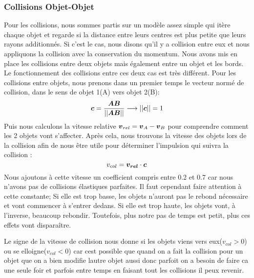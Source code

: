 \documentclass[a4paper, 11pt, oneside]{article} %
\begin{document}
        \subsubsection{Collisions Objet-Objet}
            Pour les collisions, nous sommes partis sur un modèle assez simple qui itère chaque objet et regarde si la distance entre leurs centres est plus petite que leurs rayons additionnés. Si c'est le cas, nous disons qu'il y a collision entre eux et nous appliquons la collision avec la conservation du momentum. 
            Nous avons mis en place les collisions entre deux objets mais également entre un objet et les bords. Le fonctionnement des collisions entre ces deux cas est très différent. Pour les collisions entre objets, nous prenons dans un premier temps le vecteur normé de collision, dans le sens de objet 1(A) vers objet 2(B):
            \begin{equation}
                \vb*{c} = \frac{\vb*{AB}}{||\vb*{AB}||} \longrightarrow ||\vb*{c}|| = 1
            \end{equation}
            Puis nous calculons la vitesse relative $\vb*{v}_{rel} = \vb*{v}_A - \vb*{v}_B$ pour comprendre comment les 2 objets vont s'affecter. Après cela, nous trouvons la vitesse des objets lors de la collision afin de nous être utile pour déterminer l'impulsion qui suivra la collision :
            \begin{equation}
                v_{col}=\vb*{v_{rel}}\cdot\vb*{c}
            \end{equation}
            Nous ajoutons à cette vitesse un coefficient compris entre 0.2 et 0.7 car nous n'avons pas de collisions élastiques parfaites. Il faut cependant faire attention à cette constante; Si elle est trop basse, les objets n'auront pas le rebond nécessaire et vont commencer à s'entrer dedans. Si elle est trop haute, les objets vont, à l'inverse, beaucoup rebondir. Toutefois, plus notre pas de temps est petit, plus ces effets vont disparaître.
            
            Le signe de la vitesse de collision nous donne si les objets viens vers eux($v_{col} > 0$) ou se elloigne($v_{col} < 0$) car cest possible que quand on a fait la collision pour un objet que on a bien modifie lautre objet aussi donc parfoit on a besoin de faire ca une seule foir et parfois entre temps en faisant tout les collisions il peux revenir. %
            
\end{document}
